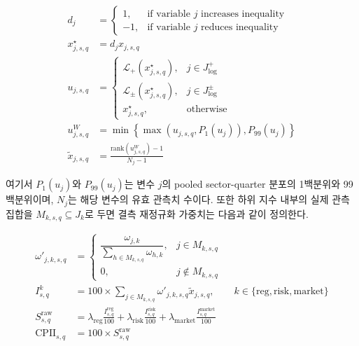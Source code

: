 \documentclass[11pt,a4paper]{report}
\begin{document}
\begin{align}
d_j &=
\begin{cases}
1, & \text{if variable } j \text{ increases inequality} \\
-1, & \text{if variable } j \text{ reduces inequality}
\end{cases} \\
x^{\star}_{j,s,q} &= d_j x_{j,s,q} \\
u_{j,s,q} &=
\begin{cases}
\mathcal{L}_{+}(x^{\star}_{j,s,q}), & j \in J_{\log}^{+} \\
\mathcal{L}_{\pm}(x^{\star}_{j,s,q}), & j \in J_{\log}^{\pm} \\
x^{\star}_{j,s,q}, & \text{otherwise}
\end{cases} \\
u^{W}_{j,s,q} &= \min\!\left\{\max\!\left(u_{j,s,q}, P_{1}(u_j)\right), P_{99}(u_j)\right\} \\
\widetilde{x}_{j,s,q} &= \frac{\mathrm{rank}(u^{W}_{j,s,q})-1}{N_j-1} \label{eq:cpii_preprocess_steps}
\end{align}

여기서 $P_{1}(u_j)$와 $P_{99}(u_j)$는 변수 $j$의 pooled sector-quarter 분포의 1백분위와 99백분위이며, $N_j$는 해당 변수의 유효 관측치 수이다. 또한 하위 지수 내부의 실제 관측 집합을 $M_{k,s,q}\subseteq J_k$로 두면 결측 재정규화 가중치는 다음과 같이 정의한다.

\begin{align}
\omega'_{j,k,s,q} &=
\begin{cases}
\dfrac{\omega_{j,k}}{\sum_{h \in M_{k,s,q}}\omega_{h,k}}, & j \in M_{k,s,q} \\
0, & j \notin M_{k,s,q}
\end{cases} \\
I^{k}_{s,q} &= 100 \times \sum_{j \in M_{k,s,q}} \omega'_{j,k,s,q}\widetilde{x}_{j,s,q}, \qquad k \in \{\mathrm{reg},\mathrm{risk},\mathrm{market}\} \\
S^{\mathrm{raw}}_{s,q} &= \lambda_{\mathrm{reg}}\frac{I^{\mathrm{reg}}_{s,q}}{100} + \lambda_{\mathrm{risk}}\frac{I^{\mathrm{risk}}_{s,q}}{100} + \lambda_{\mathrm{market}}\frac{I^{\mathrm{market}}_{s,q}}{100} \\
\mathrm{CPII}_{s,q} &= 100 \times S^{\mathrm{raw}}_{s,q} \label{eq:cpii_aggregation_steps}
\end{align}
\end{document}
